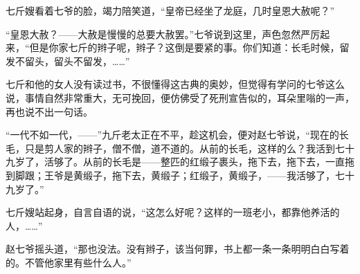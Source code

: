 \documentclass[12pt,UTF8]{ctexbook}
\begin{document}
七斤嫂看着七爷的脸，竭力陪笑道，“皇帝已经坐了龙庭，几时皇恩大赦呢？”

“皇恩大赦？——大赦是慢慢的总要大赦罢。”七爷说到这里，声色忽然严厉起来，“但是你家七斤的辫子呢，辫子？这倒是要紧的事。你们知道：长毛时候，留发不留头，留头不留发，……”

七斤和他的女人没有读过书，不很懂得这古典的奥妙，但觉得有学问的七爷这么说，事情自然非常重大，无可挽回，便仿佛受了死刑宣告似的，耳朵里嗡的一声，再也说不出一句话。

“一代不如一代，——”九斤老太正在不平，趁这机会，便对赵七爷说，“现在的长毛，只是剪人家的辫子，僧不僧，道不道的。从前的长毛，这样的么？我活到七十九岁了，活够了。从前的长毛是——整匹的红缎子裹头，拖下去，拖下去，一直拖到脚跟；王爷是黄缎子，拖下去，黄缎子；红缎子，黄缎子，——我活够了，七十九岁了。”

七斤嫂站起身，自言自语的说，“这怎么好呢？这样的一班老小，都靠他养活的人，……”

赵七爷摇头道，“那也没法。没有辫子，该当何罪，书上都一条一条明明白白写着的。不管他家里有些什么人。”
\end{document}
